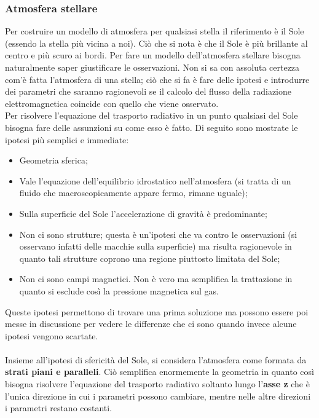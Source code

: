 \documentclass[a4paper,11pt]{article}
\begin{document}
\subsubsection{Atmosfera stellare}
Per costruire un modello di atmosfera per qualsiasi stella il riferimento è il  Sole (essendo la stella più vicina a noi). Ciò che si nota è che il Sole è più brillante al centro e più scuro ai bordi. Per fare un modello dell'atmosfera stellare bisogna naturalmente saper giustificare le osservazioni. Non si sa con assoluta certezza com'è fatta l'atmosfera di una stella; ciò che si fa è fare delle ipotesi e introdurre dei parametri che saranno ragionevoli se il calcolo del flusso della radiazione elettromagnetica coincide con quello che viene osservato.
\\ Per risolvere l'equazione del trasporto radiativo in un punto qualsiasi del Sole bisogna fare delle assunzioni su come esso è fatto. Di seguito sono mostrate le ipotesi più semplici e immediate:
\begin{itemize}
    \item Geometria sferica;
    \item Vale l'equazione dell'equilibrio idrostatico nell'atmosfera (si tratta di un fluido che macroscopicamente appare fermo, rimane uguale);
    \item Sulla superficie del Sole l'accelerazione di gravità è predominante;
    \item Non ci sono strutture; questa è un'ipotesi che va contro le osservazioni (si osservano infatti delle macchie sulla superficie) ma risulta ragionevole in quanto tali strutture coprono una regione piuttosto limitata del Sole;
    \item Non ci sono campi magnetici. Non è vero ma semplifica la trattazione in quanto si esclude così la pressione magnetica sul gas.
\end{itemize}
Queste ipotesi permettono di trovare una prima soluzione ma possono essere poi messe in discussione per vedere le differenze che ci sono quando invece alcune ipotesi vengono scartate.
\\ \\ Insieme all'ipotesi di sfericità del Sole, si considera l'atmosfera come formata da \textbf{strati piani e paralleli}. Ciò semplifica enormemente la geometria in quanto così bisogna risolvere l'equazione del trasporto radiativo soltanto lungo l'\textbf{asse z} che è l'unica direzione in cui i parametri possono cambiare, mentre nelle altre direzioni i parametri restano costanti.
\end{document}
